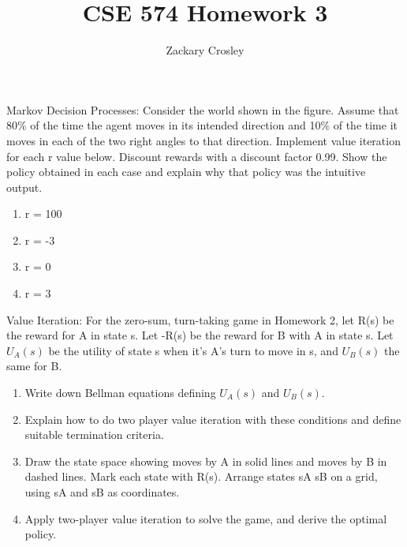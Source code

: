 \documentclass[11pt]{article}
\newenvironment{problem}[2][Problem]{\begin{trivlist}
\item[\hskip \labelsep {\bfseries #1}\hskip \labelsep {\bfseries #2.}]}{\end{trivlist}}
\begin{document}
\title{CSE 574 Homework 3}
\author{Zackary Crosley}
\maketitle

\begin{problem}{1} Markov Decision Processes: Consider the world shown in the figure. Assume that 80\% of the time the agent moves in its intended direction and 10\% of the time it moves in each of the two right angles to that direction. Implement value iteration for each r value below. Discount rewards with a discount factor 0.99. Show the policy obtained in each case and explain why that policy was the intuitive output.
\begin{enumerate}
	\item r = 100
	\item r = -3
	\item r = 0
	\item r = 3
\end{enumerate}
\end{problem}
\begin{problem}{2} Value Iteration: For the zero-sum, turn-taking game in Homework 2, let R(s) be the reward for A in state s. Let -R(s) be the reward for B with A in state s. Let $U_A (s)$ be the utility of state s when it's A's turn to move in s, and $U_B (s)$ the same for B.
\begin{enumerate}
	\item Write down Bellman equations defining $U_A (s)$ and $U_B (s)$.
	\item Explain how to do two player value iteration with these conditions and define suitable termination criteria.
	\item Draw the state space showing moves by A in solid lines and moves by B in dashed lines. Mark each state with R(s). Arrange states sA sB on a grid, using sA and sB as coordinates.
	\item Apply two-player value iteration to solve the game, and derive the optimal policy.
\end{enumerate}
\end{problem}
\begin{problem}{3}
\end{problem}
\begin{problem}{4}
\end{problem}
\begin{problem}{5}
\end{problem}
\begin{problem}{6} 
\end{problem}
\begin{problem}{7}
\end{problem}
\end{document}

